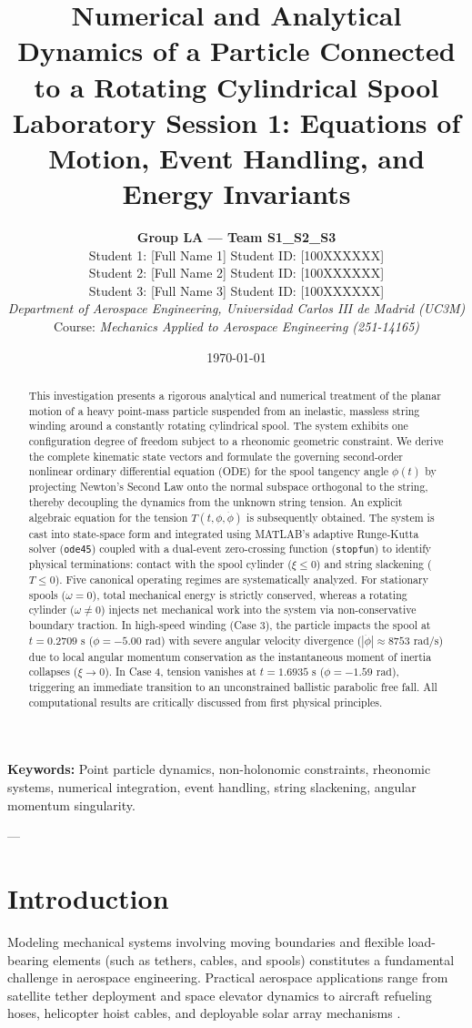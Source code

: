 \documentclass[11pt,a4paper]{article}
\title{\vspace{-1.5cm}
    \textbf{\Large Numerical and Analytical Dynamics of a Particle Connected to a Rotating Cylindrical Spool} \\
    \large Laboratory Session 1: Equations of Motion, Event Handling, and Energy Invariants
}
\author{
    \textbf{Group LA --- Team S1\_S2\_S3} \\[0.5em]
    \small Student 1: [Full Name 1] \quad Student ID: [100XXXXXX] \\
    \small Student 2: [Full Name 2] \quad Student ID: [100XXXXXX] \\
    \small Student 3: [Full Name 3] \quad Student ID: [100XXXXXX] \\[0.5em]
    \small \textit{Department of Aerospace Engineering, Universidad Carlos III de Madrid (UC3M)} \\
    \small Course: \textit{Mechanics Applied to Aerospace Engineering (251-14165)}
}
\date{\today}
\begin{document}
\maketitle

\begin{abstract}
This investigation presents a rigorous analytical and numerical treatment of the planar motion of a heavy point-mass particle suspended from an inelastic, massless string winding around a constantly rotating cylindrical spool. The system exhibits one configuration degree of freedom subject to a rheonomic geometric constraint. We derive the complete kinematic state vectors and formulate the governing second-order nonlinear ordinary differential equation (ODE) for the spool tangency angle $\phi(t)$ by projecting Newton's Second Law onto the normal subspace orthogonal to the string, thereby decoupling the dynamics from the unknown string tension. An explicit algebraic equation for the tension $T(t, \phi, \dot{\phi})$ is subsequently obtained. The system is cast into state-space form and integrated using MATLAB's adaptive Runge-Kutta solver (\texttt{ode45}) coupled with a dual-event zero-crossing function (\texttt{stopfun}) to identify physical terminations: contact with the spool cylinder ($\xi \le 0$) and string slackening ($T \le 0$). Five canonical operating regimes are systematically analyzed. For stationary spools ($\omega = 0$), total mechanical energy is strictly conserved, whereas a rotating cylinder ($\omega \neq 0$) injects net mechanical work into the system via non-conservative boundary traction. In high-speed winding (Case 3), the particle impacts the spool at $t = 0.2709\text{ s}$ ($\phi = -5.00\text{ rad}$) with severe angular velocity divergence ($|\dot{\phi}| \approx 8753\text{ rad/s}$) due to local angular momentum conservation as the instantaneous moment of inertia collapses ($\xi \to 0$). In Case 4, tension vanishes at $t = 1.6935\text{ s}$ ($\phi = -1.59\text{ rad}$), triggering an immediate transition to an unconstrained ballistic parabolic free fall. All computational results are critically discussed from first physical principles.
\end{abstract}

\vspace{0.5em}
\noindent\textbf{Keywords:} Point particle dynamics, non-holonomic constraints, rheonomic systems, numerical integration, event handling, string slackening, angular momentum singularity.

---

\section{Introduction}
Modeling mechanical systems involving moving boundaries and flexible load-bearing elements (such as tethers, cables, and spools) constitutes a fundamental challenge in aerospace engineering. Practical aerospace applications range from satellite tether deployment and space elevator dynamics to aircraft refueling hoses, helicopter hoist cables, and deployable solar array mechanisms \cite{goldstein2002classical, meriam2012engineering}. 
\end{document}
